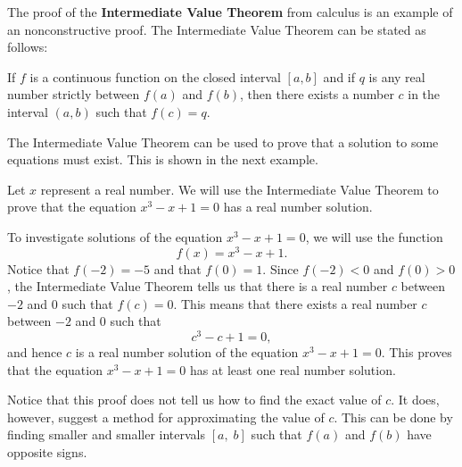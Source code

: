 The proof of the \textbf{Intermediate Value Theorem}
%
 from calculus is an example of an nonconstructive proof.  The Intermediate Value Theorem can be stated as follows:
\begin{list}{}
\item If  $f$  is a continuous function on the closed interval  $\left[ {a,b} \right]$ and if  $q$  is any real number strictly between  $f\left( a \right)$  and  $f\left( b \right)$, then there exists a number  $c$  in the interval  $\left( {a,b} \right)$ such that  $f\left( c \right) = q$.
\end{list}
\vskip10pt
%
The Intermediate Value Theorem can be used to prove that a solution to some equations must exist.  This is shown in the next example.
\hbreak
%
\begin{example}
Let  $x$  represent a real number.  We will use the Intermediate Value Theorem to prove that the equation  $x^3  - x + 1 = 0$ has a real number solution.

To investigate solutions of the equation  $x^3  - x + 1 = 0$, we will use the function
\[
f\left( x \right) = x^3  - x + 1.
\]
Notice that  $f\left( { - 2} \right) =  - 5$  and that  $f\left( 0 \right) = 1$.  Since 
$f \left( -2 \right) < 0$ and $f \left( 0 \right) > 0$, the Intermediate Value Theorem tells us that there is a real number  $c$  between  $-2$ and  $0$  such that  $f\left( c \right) = 0$.  This means that there exists a real number $c$ between $-2$ and $0$ such that
\[
c^3  - c + 1 = 0,
\]
and hence  $c$  is a real number solution of the equation  $x^3  - x + 1 = 0$.  This proves that the equation  $x^3  - x + 1 = 0$  has at least one real number solution.


Notice that this proof does not tell us how to find the exact value of  $c$.  It does, however, suggest a method for approximating the value of  $c$.  This can be done by finding smaller and smaller intervals  $\left[ {a,\;b} \right]$  such that  $f\left( a \right)$  and  $f\left( b \right)$  have opposite signs.
\end{example}
\hbreak
%
